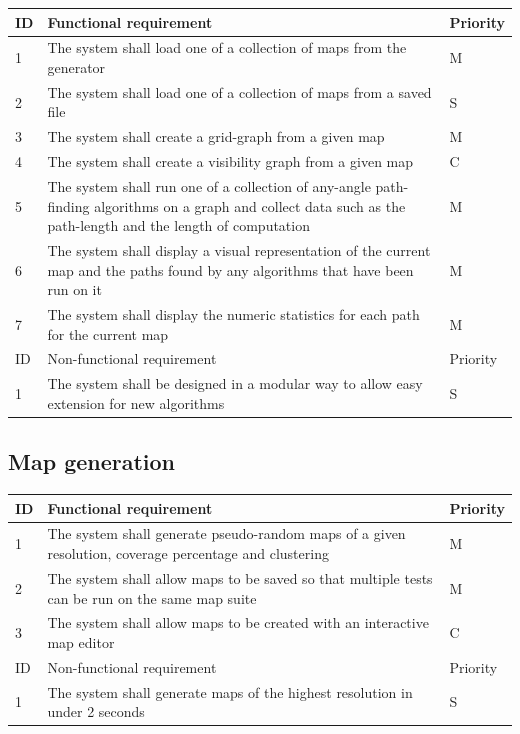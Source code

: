 \documentclass[12pt,notitlepage]{report}
\begin{document}
\begin{center}
    \begin{tabular}{ l | p{10cm} | l}
    ID & Functional requirement & Priority  \\ \hline
    1 & The system shall load one of a collection of maps from the generator & M \\ \hline
    2 & The system shall load one of a collection of maps from a saved file & S \\ \hline
    3 & The system shall create a grid-graph from a given map & M \\ \hline
    4 & The system shall create a visibility graph from a given map & C \\ \hline
    5 & The system shall run one of a collection of any-angle path-finding algorithms on a graph and collect data such as the path-length and the length of computation & M \\ \hline
    6 & The system shall display a visual representation of the current map and the paths found by any algorithms that have been run on it & M \\ \hline
    7 & The system shall display the numeric statistics for each path for the current map & M \\ \hline
     \hline 
    ID & Non-functional requirement & Priority  \\ \hline
    1 & The system shall be designed in a modular way to allow easy extension for new algorithms & S \\
    \end{tabular}
\end{center}

\subsection{Map generation}

\begin{center}
    \begin{tabular}{ l | p{10cm} | l }
    ID & Functional requirement & Priority  \\ \hline
    1 & The system shall generate pseudo-random maps of a given resolution, coverage percentage and clustering & M \\ \hline
    2 & The system shall allow maps to be saved so that multiple tests can be run on the same map suite & M \\ \hline
     3 & The system shall allow maps to be created with an interactive map editor & C\\ \hline
          \hline 
    ID & Non-functional requirement & Priority  \\ \hline
    1 & The system shall generate maps of the highest resolution in under 2 seconds & S \\
    \end{tabular}
\end{center}
	
\end{document}
